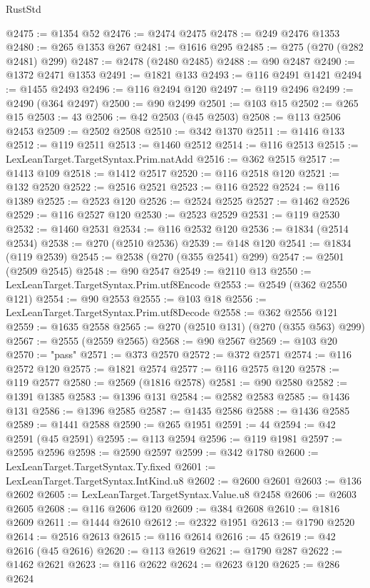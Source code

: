 \begin{lexlean}{RustStd}
\begin{coremodule}
@2475 := @1354 @52
@2476 := @2474 @2475
@2478 := @249 @2476 @1353
@2480 := @265 @1353 @267
@2481 := @1616 @295
@2485 := @275 (@270 (@282 @2481) @299)
@2487 := @2478 (@2480 @2485)
@2488 := @90 @2487
@2490 := @1372 @2471 @1353
@2491 := @1821 @133
@2493 := @116 @2491 @1421
@2494 := @1455 @2493
@2496 := @116 @2494 @120
@2497 := @119 @2496
@2499 := @2490 (@364 @2497)
@2500 := @90 @2499
@2501 := @103 @15
@2502 := @265 @15
@2503 := 43
@2506 := @42 @2503 (@45 @2503)
@2508 := @113 @2506 @2453
@2509 := @2502 @2508
@2510 := @342 @1370
@2511 := @1416 @133
@2512 := @119 @2511
@2513 := @1460 @2512
@2514 := @116 @2513
@2515 := LexLeanTarget.TargetSyntax.Prim.natAdd
@2516 := @362 @2515
@2517 := @1413 @109
@2518 := @1412 @2517
@2520 := @116 @2518 @120
@2521 := @132 @2520
@2522 := @2516 @2521
@2523 := @116 @2522
@2524 := @116 @1389
@2525 := @2523 @120
@2526 := @2524 @2525
@2527 := @1462 @2526
@2529 := @116 @2527 @120
@2530 := @2523 @2529
@2531 := @119 @2530
@2532 := @1460 @2531
@2534 := @116 @2532 @120
@2536 := @1834 (@2514 @2534)
@2538 := @270 (@2510 @2536)
@2539 := @148 @120
@2541 := @1834 (@119 @2539)
@2545 := @2538 (@270 (@355 @2541) @299)
@2547 := @2501 (@2509 @2545)
@2548 := @90 @2547
@2549 := @2110 @13
@2550 := LexLeanTarget.TargetSyntax.Prim.utf8Encode
@2553 := @2549 (@362 @2550 @121)
@2554 := @90 @2553
@2555 := @103 @18
@2556 := LexLeanTarget.TargetSyntax.Prim.utf8Decode
@2558 := @362 @2556 @121
@2559 := @1635 @2558
@2565 := @270 (@2510 @131) (@270 (@355 @563) @299)
@2567 := @2555 (@2559 @2565)
@2568 := @90 @2567
@2569 := @103 @20
@2570 := "pass"
@2571 := @373 @2570
@2572 := @372 @2571
@2574 := @116 @2572 @120
@2575 := @1821 @2574
@2577 := @116 @2575 @120
@2578 := @119 @2577
@2580 := @2569 (@1816 @2578)
@2581 := @90 @2580
@2582 := @1391 @1385
@2583 := @1396 @131
@2584 := @2582 @2583
@2585 := @1436 @131
@2586 := @1396 @2585
@2587 := @1435 @2586
@2588 := @1436 @2585
@2589 := @1441 @2588
@2590 := @265 @1951
@2591 := 44
@2594 := @42 @2591 (@45 @2591)
@2595 := @113 @2594
@2596 := @119 @1981
@2597 := @2595 @2596
@2598 := @2590 @2597
@2599 := @342 @1780
@2600 := LexLeanTarget.TargetSyntax.Ty.fixed
@2601 := LexLeanTarget.TargetSyntax.IntKind.u8
@2602 := @2600 @2601
@2603 := @136 @2602
@2605 := LexLeanTarget.TargetSyntax.Value.u8 @2458
@2606 := @2603 @2605
@2608 := @116 @2606 @120
@2609 := @384 @2608
@2610 := @1816 @2609
@2611 := @1444 @2610
@2612 := @2322 @1951
@2613 := @1790 @2520
@2614 := @2516 @2613
@2615 := @116 @2614
@2616 := 45
@2619 := @42 @2616 (@45 @2616)
@2620 := @113 @2619
@2621 := @1790 @287
@2622 := @1462 @2621
@2623 := @116 @2622
@2624 := @2623 @120
@2625 := @286 @2624

\end{coremodule}
\end{lexlean}
